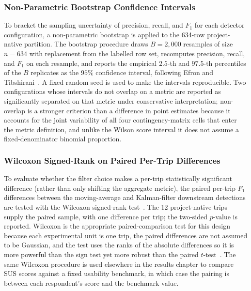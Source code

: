 \subsubsection{Non-Parametric Bootstrap Confidence Intervals}
\label{sec:proto_bootstrap}

To bracket the sampling uncertainty of precision, recall, and $F_1$ for each detector configuration, a non-parametric bootstrap is applied to the 634-row project-native partition. The bootstrap procedure draws $B = 2{,}000$ resamples of size $n = 634$ with replacement from the labelled row set, recomputes precision, recall, and $F_1$ on each resample, and reports the empirical $2.5$-th and $97.5$-th percentiles of the $B$ replicates as the $95\%$ confidence interval, following Efron and Tibshirani~\cite{efron1994bootstrap}. A fixed random seed is used to make the intervals reproducible. Two configurations whose intervals do not overlap on a metric are reported as significantly separated on that metric under conservative interpretation; non-overlap is a stronger criterion than a difference in point estimates because it accounts for the joint variability of all four contingency-matrix cells that enter the metric definition, and unlike the Wilson score interval it does not assume a fixed-denominator binomial proportion.

\subsubsection{Wilcoxon Signed-Rank on Paired Per-Trip Differences}
\label{sec:proto_wilcoxon}

To evaluate whether the filter choice makes a per-trip statistically significant difference (rather than only shifting the aggregate metric), the paired per-trip $F_1$ differences between the moving-average and Kalman-filter downstream detections are tested with the Wilcoxon signed-rank test~\cite{wilcoxon1945individual}. The 12 project-native trips supply the paired sample, with one difference per trip; the two-sided $p$-value is reported. Wilcoxon is the appropriate paired-comparison test for this design because each experimental unit is one trip, the paired differences are not assumed to be Gaussian, and the test uses the ranks of the absolute differences so it is more powerful than the sign test yet more robust than the paired $t$-test~\cite{demsar2006statistical}. The same Wilcoxon procedure is used elsewhere in the results chapter to compare SUS scores against a fixed usability benchmark, in which case the pairing is between each respondent's score and the benchmark value.

